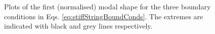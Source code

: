 \begin{figure}[h]
    \centering
    \hfill
    \hfill
    \caption{Plots of the first (normalised) modal shape for the three boundary conditions in Eqs. \eqref{eq:stiffStringBoundConds}. The extremes are indicated with black and grey lines respectively. \label{fig:boundaryCondsStiffString}}
\end{figure}

